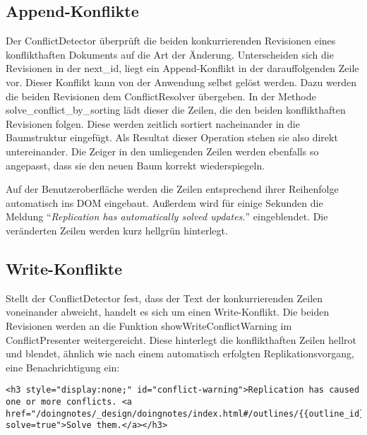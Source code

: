 \subsection{Append-Konflikte}
\label{subsec:appendconflict-implementierung}

Der {\selectfont ConflictDetector} überprüft die beiden konkurrierenden Revisionen eines konflikthaften Dokuments auf die Art der Änderung. Unterscheiden sich die Revisionen in der {\selectfont next\_id}, liegt ein Append-Konflikt in der darauffolgenden Zeile vor. Dieser Konflikt kann von der Anwendung selbst gelöst werden. Dazu werden die beiden Revisionen dem {\selectfont ConflictResolver} übergeben. In der Methode {\selectfont solve\_conflict\_by\_sorting} lädt dieser die Zeilen, die den beiden konflikthaften Revisionen folgen. Diese werden zeitlich sortiert nacheinander in die Baumstruktur eingefügt. Als Resultat dieser Operation stehen sie also direkt untereinander. Die Zeiger in den umliegenden Zeilen werden ebenfalls so angepasst, dass sie den neuen Baum korrekt wiederspiegeln. 

Auf der Benutzeroberfläche werden die Zeilen entsprechend ihrer Reihenfolge automatisch ins DOM eingebaut. Außerdem wird für einige Sekunden die Meldung \enquote{\textit{Replication has automatically solved updates.}} eingeblendet. Die veränderten Zeilen werden kurz hellgrün hinterlegt.


\subsection{Write-Konflikte}
\label{subsec:writeconflict-implementierung}

Stellt der {\selectfont ConflictDetector} fest, dass der Text der konkurrierenden Zeilen voneinander abweicht, handelt es sich um einen Write-Konflikt. Die beiden Revisionen werden an die Funktion  {\selectfont showWriteConflictWarning} im {\selectfont ConflictPresenter} weitergereicht. Diese hinterlegt die konflikthaften Zeilen hellrot und blendet, ähnlich wie nach einem automatisch erfolgten Replikationsvorgang, eine Benachrichtigung ein: 

\lstset{language=html}
\medskip 
\begin{lstlisting}[caption=Benachrichtigung über konflikthaften Status der Datenbank]
<h3 style="display:none;" id="conflict-warning">Replication has caused one or more conflicts. <a href="/doingnotes/_design/doingnotes/index.html#/outlines/{{outline_id}}?solve=true">Solve them.</a></h3>
\end{lstlisting}

